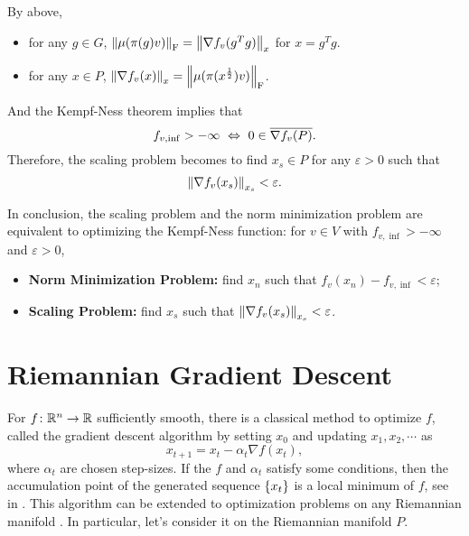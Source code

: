 \documentclass[suri,pdfbookmark]{engsuribt} %
\begin{document}
  By above, 
  \begin{itemize}
    \item for any $g\in G$, $\left\lVert\mu(\pi(g)v)\right\lVert_{\operatorname{F}} = \left\lVert\nabla f_v(g^Tg)\right\lVert_{x}$ for $x=g^Tg$.
    \item for any $x \in P$, $\left\lVert\nabla f_v(x)\right\lVert_{x} = \left\lVert\mu(\pi(x^{\frac{1}{2}})v)\right\lVert_{\operatorname{F}}$.
  \end{itemize}
  And the Kempf-Ness theorem implies that
  \begin{equation*}
    f_{v,\inf} > -\infty~\Leftrightarrow~ 0 \in \overline{\nabla f_v(P)}.
  \end{equation*}
  Therefore, the scaling problem becomes to find $x_s \in P$ for any $\varepsilon > 0$ such that
  \begin{equation*}
    \left\lVert\nabla{f_v(x_s)}\right\lVert_{x_s} < \varepsilon.
  \end{equation*}

  In conclusion, the scaling problem and the norm minimization problem are equivalent to optimizing the Kempf-Ness function: for $v \in V$ with $f_{v,\inf} > -\infty$ and $\varepsilon >0$,
  \begin{itemize}
    \item \textbf{Norm Minimization Problem:} find $x_n$ such that $f_v(x_n) - f_{v,\inf} < \varepsilon$;
    \item \textbf{Scaling Problem:} find $x_s$ such that $\left\lVert\nabla{f_v(x_s)}\right\lVert_{x_s} < \varepsilon$.
  \end{itemize}

  \section{Riemannian Gradient Descent}

  For $f \colon \mathbb{R}^n \rightarrow \mathbb{R}$ sufficiently smooth, there is a classical method to optimize $f$, called the gradient descent algorithm by setting $x_0$ and updating $x_1,x_2,\cdots$ as
  \begin{equation*}
    x_{t+1} = x_t - \alpha_t \nabla f(x_t),
  \end{equation*}
  where $\alpha_t$ are chosen step-sizes. If the $f$ and $\alpha_t$ satisfy some conditions, then the accumulation point of the generated sequence $\left\{x_t\right\}$ is a local minimum of $f$, see in \cite{key28}. This algorithm can be extended to optimization problems on any Riemannian manifold \cite[Chapter 4]{key7}. In particular, let's consider it on the Riemannian manifold $P$.
\end{document}
